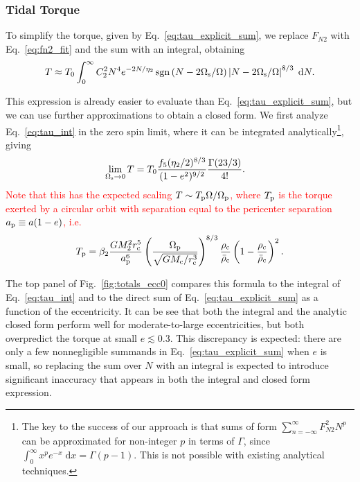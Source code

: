 \documentclass[
        fleqn,
        usenatbib,
    ]{mnras}
\newcommand*{\p}[1]{\left(#1\right)}
\DeclareMathOperator*{\sgn}{sgn}
\begin{document}
\subsubsection{Tidal Torque}\label{ss:torque_eval}

To simplify the torque, given by Eq.~\eqref{eq:tau_explicit_sum}, we replace
$F_{N2}$ with Eq.~\eqref{eq:fn2_fit} and the sum with an integral, obtaining
\begin{equation}
    T \approx T_0 \int_0^\infty C_2^2 N^4 e^{-2N / \eta_2}
        \sgn\left(N - 2\Omega_{\rm s} / \Omega\right) \left|N - 2 \Omega_{\rm s} /
            \Omega\right|^{8/3}\;\mathrm{d}N.\label{eq:tau_int}
\end{equation}

This expression is already easier to evaluate than
Eq.~\eqref{eq:tau_explicit_sum}, but we can use further approximations to obtain
a closed form. We first analyze Eq.~\eqref{eq:tau_int} in the zero spin limit,
where it can be integrated analytically\footnote{The key to the success of our
approach is that sums of form $\sum_{n = -\infty}^\infty F_{N2}^2 N^p$ can be
approximated for non-integer $p$ in terms of $\Gamma$, since $\int_0^\infty
x^pe^{-x}\;\mathrm{d}x = \Gamma(p - 1)$. This is not possible with existing
analytical techniques.}, giving
\begin{align}
    \lim_{\Omega_{\rm s} \to 0} T &= T_0 \frac{f_5 (\eta_2/2)^{8/3}}{(1 -
        e^2)^{9/2}} \frac{\Gamma(23/3)}{4!}.\label{eq:tau_lowspin}
\end{align}
\textcolor{red}{Note that this has the expected scaling $T \sim T_{\rm p} \Omega
/ \Omega_{\rm p}$, where $T_{\rm p}$ is the torque exerted by a circular orbit
with separation equal to the pericenter separation $a_{\rm p} \equiv a(1 - e)$,
i.e.
\begin{equation}
    T_{\rm p} = \beta_2\frac{GM_2^2r_{\rm c}^5}{a_{\rm p}^6}
            \p{\frac{\Omega_{\rm p}}{\sqrt{GM_{\rm c}/r_{\rm c}^3}}}^{8/3}
            \frac{\rho_{\rm c}}{\bar{\rho}_{\rm c}} \p{1 - \frac{\rho_{\rm
            c}}{\bar{\rho}_{\rm c}}}^2.\label{eq:def_tperi}
\end{equation}}

The top panel of Fig.~\ref{fig:totals_ecc0} compares this formula to the
integral of Eq.~\eqref{eq:tau_int} and to the direct sum of
Eq.~\eqref{eq:tau_explicit_sum} as a function of the eccentricity. It can be see
that both the integral and the analytic closed form perform well for
moderate-to-large eccentricities, but both overpredict the torque at small $e
\lesssim 0.3$. This discrepancy is expected: there are only a few nonnegligible
summands in Eq.~\eqref{eq:tau_explicit_sum} when $e$ is small, so replacing the
sum over $N$ with an integral is expected to introduce significant inaccuracy
that appears in both the integral and closed form expression.
\end{document}
